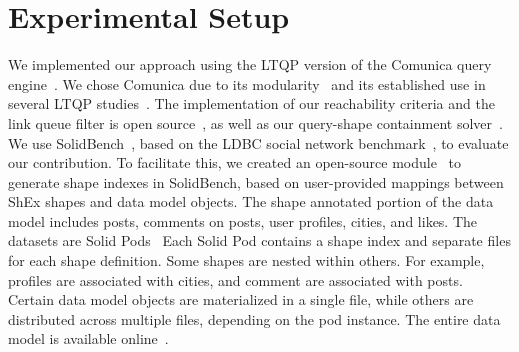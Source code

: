 \section{Experimental Setup}







We implemented our approach using the LTQP version of the Comunica query engine~\cite{taelman_iswc_resources_comunica_2018}.
We chose Comunica due to its modularity~\cite{taelman_swj_componentsjs_2022} and its established use in several LTQP studies~\cite{Bogaerts2021LinkTW, Taelman2023, eschauzier_quweda_linkqueue_2023, Hanski2024, eschauzier_amw_rcubemetric_2024, tam2024opportunitiesshapebasedoptimizationlink}.
The implementation of our reachability criteria and the link queue filter is open source~, as well as our query-shape containment solver~.
We use SolidBench~\cite{Taelman2023}, based on the LDBC social network benchmark~\cite{Angles2020}, to evaluate our contribution. 
To facilitate this, we created an open-source module~ to generate shape indexes in SolidBench, based on user-provided mappings between ShEx shapes and data model objects.
The shape annotated portion of the data model includes posts, comments on posts, user profiles, cities, and likes.
The datasets are Solid Pods~\cite{Taelman2023}
Each Solid Pod contains a shape index and separate files for each shape definition.
Some shapes are nested within others. 
For example, profiles are associated with cities, and comment are associated with posts.
Certain data model objects are materialized in a single file, while others are distributed across multiple files, depending on the pod instance.
The entire data model is available online~.




